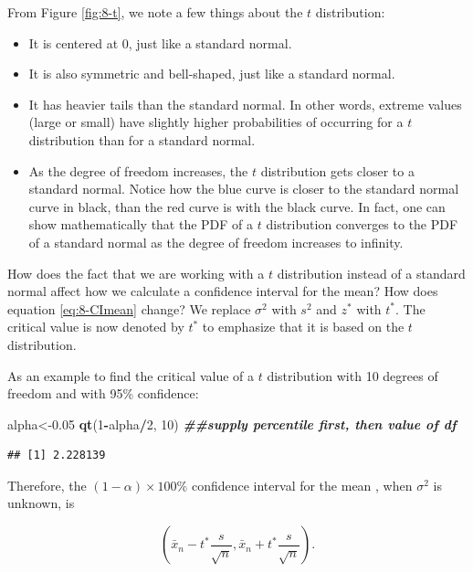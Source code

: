 \documentclass[
]{book}
\newenvironment{Shaded}{\begin{snugshade}}{\end{snugshade}}
\newcommand{\DecValTok}[1]{\textcolor[rgb]{0.00,0.00,0.81}{#1}}
\newcommand{\DocumentationTok}[1]{\textcolor[rgb]{0.56,0.35,0.01}{\textbf{\textit{#1}}}}
\newcommand{\FloatTok}[1]{\textcolor[rgb]{0.00,0.00,0.81}{#1}}
\newcommand{\FunctionTok}[1]{\textcolor[rgb]{0.13,0.29,0.53}{\textbf{#1}}}
\newcommand{\NormalTok}[1]{#1}
\newcommand{\OtherTok}[1]{\textcolor[rgb]{0.56,0.35,0.01}{#1}}
\newcommand{\SpecialCharTok}[1]{\textcolor[rgb]{0.81,0.36,0.00}{\textbf{#1}}}
\providecommand{\tightlist}{%
  \setlength{\itemsep}{0pt}\setlength{\parskip}{0pt}}
\begin{document}
From Figure \ref{fig:8-t}, we note a few things about the \(t\) distribution:

\begin{itemize}
\tightlist
\item
  It is centered at 0, just like a standard normal.
\item
  It is also symmetric and bell-shaped, just like a standard normal.
\item
  It has heavier tails than the standard normal. In other words, extreme values (large or small) have slightly higher probabilities of occurring for a \(t\) distribution than for a standard normal.
\item
  As the degree of freedom increases, the \(t\) distribution gets closer to a standard normal. Notice how the blue curve is closer to the standard normal curve in black, than the red curve is with the black curve. In fact, one can show mathematically that the PDF of a \(t\) distribution converges to the PDF of a standard normal as the degree of freedom increases to infinity.
\end{itemize}

How does the fact that we are working with a \(t\) distribution instead of a standard normal affect how we calculate a confidence interval for the mean? How does equation \eqref{eq:8-CImean} change? We replace \(\sigma^2\) with \(s^2\) and \(z^*\) with \(t^*\). The critical value is now denoted by \(t^*\) to emphasize that it is based on the \(t\) distribution.

As an example to find the critical value of a \(t\) distribution with 10 degrees of freedom and with 95\% confidence:

\begin{Shaded}
\begin{Highlighting}[]
\NormalTok{alpha}\OtherTok{\textless{}{-}}\FloatTok{0.05}
\FunctionTok{qt}\NormalTok{(}\DecValTok{1}\SpecialCharTok{{-}}\NormalTok{alpha}\SpecialCharTok{/}\DecValTok{2}\NormalTok{, }\DecValTok{10}\NormalTok{) }\DocumentationTok{\#\#supply percentile first, then value of df}
\end{Highlighting}
\end{Shaded}

\begin{verbatim}
## [1] 2.228139
\end{verbatim}

Therefore, the \((1-\alpha) \times 100\%\) confidence interval for the mean , when \(\sigma^2\) is unknown, is

\begin{equation} 
\left( \bar{x}_n - t^{*} \frac{s}{\sqrt{n}}, \bar{x}_n + t^{*} \frac{s}{\sqrt{n}} \right).
\label{eq:8-CImeant}
\end{equation}
\end{document}

